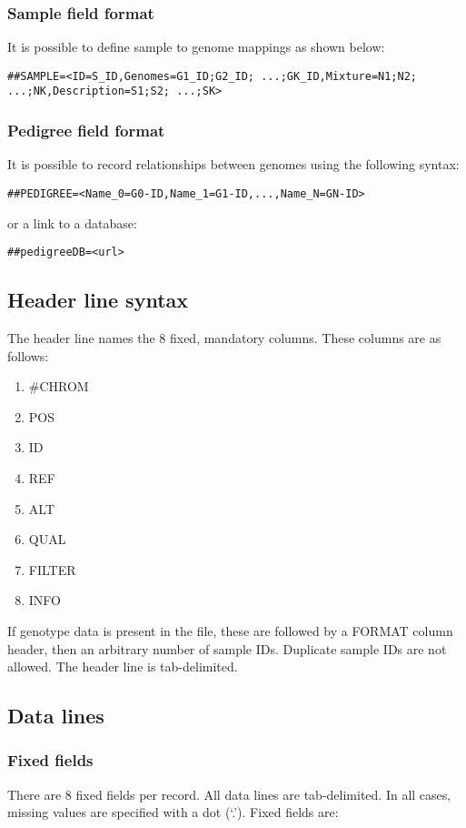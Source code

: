 \documentclass[8pt]{article}
\begin{document}
\subsubsection{Sample field format}
It is possible to define sample to genome mappings as shown below:
\small
\begin{verbatim}
##SAMPLE=<ID=S_ID,Genomes=G1_ID;G2_ID; ...;GK_ID,Mixture=N1;N2; ...;NK,Description=S1;S2; ...;SK>
\end{verbatim}
\normalsize
\subsubsection{Pedigree field format}
It is possible to record relationships between genomes using the following syntax:
\begin{verbatim}
##PEDIGREE=<Name_0=G0-ID,Name_1=G1-ID,...,Name_N=GN-ID>
\end{verbatim}
or a link to a database:
\begin{verbatim}
##pedigreeDB=<url>
\end{verbatim}
\subsection{Header line syntax}
The header line names the 8 fixed, mandatory columns. These columns are as follows:

\begin{enumerate}
  \item \#CHROM
  \item POS
  \item ID
  \item REF
  \item ALT
  \item QUAL
  \item FILTER
  \item INFO
\end{enumerate}

If genotype data is present in the file, these are followed by a FORMAT column header, then an arbitrary number of sample IDs. Duplicate sample IDs are not allowed. The header line is tab-delimited.

\subsection{Data lines}
\subsubsection{Fixed fields}
There are 8 fixed fields per record. All data lines are tab-delimited. In all cases, missing values are specified with a dot (`.'). Fixed fields are:
\end{document}
